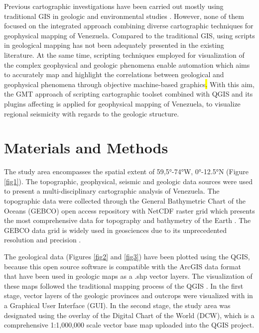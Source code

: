 \documentclass[sustainability,article,submit,pdftex,moreauthors]{Definitions/mdpi}
\begin{document}
Previous cartographic investigations have been carried out mostly using traditional GIS in geologic and environmental studies \citep{Gonzalez,Hackley,Schmitz2021,Sun}. However, none of them focused on the integrated approach combining diverse cartographic techniques for geophysical mapping of Venezuela. Compared to the traditional GIS, using scripts in geological mapping has not been adequately presented in the existing literature. At the same time, scripting techniques employed for visualization of the complex geophysical and geologic phenomena enable automation which aims to accurately map and highlight the correlations between geological and geophysical phenomena through objective machine-based graphics\hl{. }With this aim, the GMT approach of scripting cartographic toolset combined with QGIS and its plugins affecting is applied for geophysical mapping of Venezuela, to visualize regional seismicity with regards to the geologic structure. 

\section{Materials and Methods}

The study area encompasses the spatial extent of 59,5°-74°W, 0°-12.5°N (Figure \ref{fig1}). The topographic, geophysical, seismic and geologic data sources were used to present a multi-disciplinary cartographic analysis of Venezuela. The topographic data were collected through the General Bathymetric Chart of the Oceans (GEBCO) open access repository with NetCDF raster grid \cite{GEBCO} which presents the most comprehensive data for topography and bathymetry of the Earth \cite{Schenke}. The GEBCO data grid is widely used in geosciences due to its unprecedented resolution and precision \citep{Mcmichael,Cortina}. 

The geological data (Figures \ref{fig2} and \ref{fig3}) have been plotted using the QGIS, because this open source software is compatible with the ArcGIS data format that have been used in geologic maps as a .shp vector layers. The visualization of these maps followed the traditional mapping process of the QGIS \cite{Lemenkova2022a}. In the first stage, vector layers of the geologic provinces and outcrops were visualized with in a Graphical User Interface (GUI). In the second stage, the study area was designated using the overlay of the Digital Chart of the World (DCW), which is a comprehensive 1:1,000,000 scale vector base map uploaded into the QGIS project. 
\end{document}
